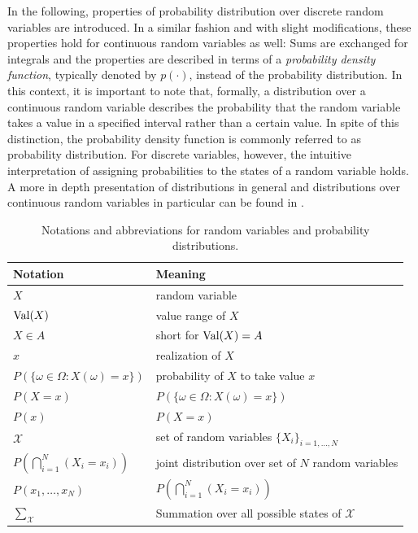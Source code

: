 In the following, properties of probability distribution over discrete random variables are
introduced. In a similar fashion and with slight modifications, these properties hold for continuous
random variables as well: Sums are exchanged for integrals and the properties are described in terms
of a \emph{probability density function}, typically denoted by $p(\cdot)$, instead of the
probability distribution. In this context, it is important to note that, formally, a distribution
over a continuous random variable describes the probability that the random variable takes a value
in a specified interval rather than a certain value. In spite of this distinction, the probability
density function is commonly referred to as probability distribution. For discrete variables,
however, the intuitive interpretation of assigning probabilities to the states of a random variable
holds. A more in depth presentation of distributions in general and distributions over continuous
random variables in particular can be found in
\citet{durrett_10_probability,billingsley_95_probability,chung_68_course}.

\begin{table}
    \centering
    \begin{tabular}{ll}
        \toprule
        Notation & Meaning \\ \midrule
        $X$ & random variable \\
        $\operatorname{Val}(X)$ & value range of $X$ \\
        $X \in A$ & short for $\operatorname{Val}(X)=A$ \\
        $x$ & realization of $X$ \\
        $P\left(\{\omega \in \Omega : X(\omega) = x\}\right)$  & probability of $X$ to take value $x$ \\
        $P(X=x)$ & $P\left(\{\omega \in \Omega : X(\omega) = x\}\right)$ \\
        $P(x)$ & $P(X=x)$ \\
        $\mathcal{X}$ & set of random variables $\{X_i\}_{i=1,\hdots,N}$ \\
        $P\left(\bigcap_{i=1}^N(X_i=x_i)\right)$ & joint distribution over set of
        $N$ random variables \\ 
        $P(x_1,\hdots,x_N)$ & $ P\left(\bigcap_{i=1}^N(X_i=x_i)\right)$ \\
        $\sum_{\mathcal{X}}$ & Summation over all possible states of $\mathcal{X}$ \\
        \bottomrule
    \end{tabular}
    \caption[Probability: Notations]{Notations and abbreviations for random variables and probability distributions.}
    \label{tab:probability-notation}
\end{table}

